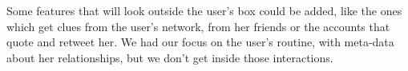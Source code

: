 Some features that will look outside the user's box could be added, like the ones which get clues from the user's network, from her friends or the accounts that quote and retweet her. We had our focus on the user's routine, with meta-data about her relationships, but we don't get inside those interactions.                



